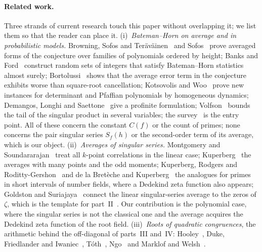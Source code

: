 \documentclass[11pt,a4paper]{article}
\theoremstyle{remark}\newtheorem{remark}[theorem]{Remark}
\begin{document}
\paragraph{Related work.} Three strands of current research touch this paper without overlapping it; we list
them so that the reader can place it. (i)~\emph{Bateman--Horn on average and in probabilistic models.} Browning,
Sofos and Ter\"av\"ainen~\cite{BrowningSofosTeravainen2022} and Sofos~\cite{Sofos2026} prove averaged forms of the
conjecture over families of polynomials ordered by height; Banks and Ford~\cite{BanksFord2026} construct random sets of
integers that satisfy Bateman--Horn statistics almost surely; Bortolussi~\cite{Bortolussi2026} shows that the average
error term in the conjecture exhibits worse than square-root cancellation; Kotsovolis and Woo~\cite{KotsovolisWoo2023}
prove new instances for determinant and Pfaffian polynomials by homogeneous dynamics; Demangos, Longhi and
Saettone~\cite{DemangosLonghiSaettone2026} give a profinite formulation; Volfson~\cite{Volfson2026} bounds the tail of the
singular product in several variables; the survey~\cite{Aletheia2020} is the entry point. All of these concern the
constant $C(f)$ or the count of primes; none concerns the pair singular series $S_f(h)$ or the second-order term of
its average, which is our object. (ii)~\emph{Averages of singular series.} Montgomery and
Soundararajan~\cite{MontgomerySoundararajan2004} treat all $k$-point correlations in the linear case;
Kuperberg~\cite{Kuperberg2022,Kuperberg2025} the averages with many points and the odd moments; Kuperberg, Rodgers and
Roditty-Gershon~\cite{KuperbergRodgersRodittyGershon2022} and de la Bret\`eche and Kuperberg~\cite{deLaBretecheKuperberg2024}
the analogues for primes in short intervals of number fields, where a Dedekind zeta function also appears; Goldston and
Suriajaya~\cite{GoldstonSuriajaya2021,GoldstonSuriajaya2021b,GoldstonSuriajaya2023} connect the linear singular-series
average to the zeros of $\zeta$, which is the template for part~II~\cite{ReichardtII}. Our contribution is the
polynomial case, where the singular series is not the classical one and the average acquires the Dedekind zeta
function of the root field. (iii)~\emph{Roots of quadratic congruences}, the arithmetic behind the off-diagonal of
parts~III and~IV: Hooley~\cite{Hooley1963}, Duke, Friedlander and Iwaniec~\cite{DFI1995}, T\'oth~\cite{Toth2000},
Ngo~\cite{Ngo2024} and Marklof and Welsh~\cite{MarklofWelsh2023}.
\end{document}
